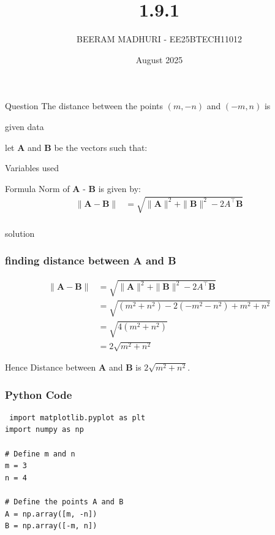 \documentclass{beamer}
\title %
{1.9.1}
\date{August  2025}
\author %
{BEERAM MADHURI - EE25BTECH11012}
\begin{document}
\frame{\titlepage}
\begin{frame}{Question}
The distance between the points $(m, -n)$ and $(-m, n)$ is \underline{\hspace{2cm}}
 
\end{frame}
 
\begin{frame}{given data}
 
\text let \textbf{A} and \textbf{B} be the vectors such that:
\begin{table}[h!]
    \centering
    
    \caption{Variables used}
    \label{table 1.9.1}
\end{table}


   
\end{frame}

\begin{frame}{Formula} 
Norm of \textbf{A} - \textbf{B} is given by:
\begin{align*}
\| \textbf{A} - \textbf{B} \| &= \sqrt{\|\textbf{A}\|^2 + \|\textbf{B}\|^2 - 2 A^\top\textbf{B} }\\
 \end{align*}
 \end{frame}
 

\begin{frame}{solution}
    \frametitle{finding distance between \textbf{A} and \textbf{B}}
\begin{align*}
\| \textbf{A} - \textbf{B} \| &= \sqrt{\|\textbf{A}\|^2 + \|\textbf{B}\|^2 - 2 A^\top\textbf{B} }\\
&= \sqrt{(m^2 + n^2) - 2(-m^2 - n^2) + m^2 + n^2} \\
&= \sqrt{4(m^2+n^2)} \\
&= 2\sqrt{m^2+n^2}
\end{align*}

\text Hence Distance between \textbf{A} and \textbf{B} is $2\sqrt{m^2+n^2}$.
\end{frame}


\begin{frame}[fragile]
    \frametitle{Python Code}
    \begin{lstlisting}
 import matplotlib.pyplot as plt
import numpy as np

# Define m and n
m = 3
n = 4

# Define the points A and B
A = np.array([m, -n])
B = np.array([-m, n])

\end{lstlisting}
\end{frame}
\end{document}
